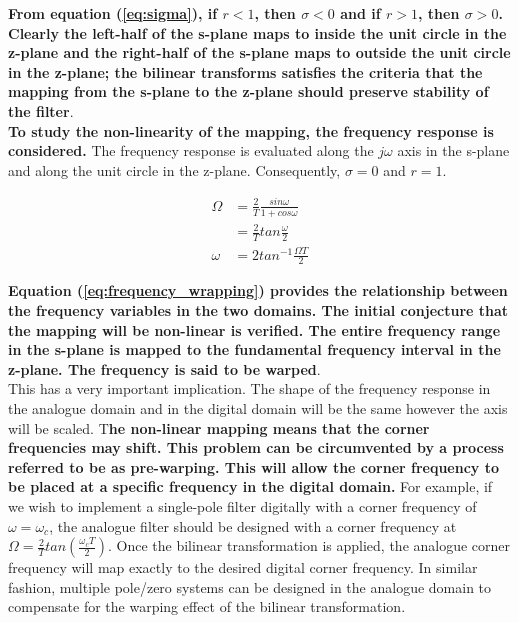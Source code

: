 \documentclass{article}
\begin{document}
\textbf{From equation (\ref{eq:sigma}), if $r < 1$, then $\sigma < 0$ and if $r > 1$, then $\sigma > 0$. Clearly the left-half of the s-plane maps to inside the unit circle in the z-plane and the right-half of the s-plane maps to outside the unit circle in the z-plane; the bilinear transforms satisfies the criteria that the mapping from the s-plane to the z-plane should preserve stability of the filter}. \\

\textbf{To study the non-linearity of the mapping, the frequency response is considered.} The frequency response is evaluated along the $j\omega$ axis in the s-plane and along the unit circle in the z-plane. Consequently, $\sigma = 0$ and $r = 1$.

\begin{align}
    \Omega &= \frac{2}{T}\frac{sin\omega}{1+cos\omega}\nonumber \\
           &= \frac{2}{T}tan\frac{\omega}{2} \nonumber \\
    \omega &= 2tan^{-1}\frac{\Omega T}{2} \label{eq:frequency_wrapping}
\end{align}

\textbf{Equation (\ref{eq:frequency_wrapping}) provides the relationship between the frequency variables in the two domains. The initial conjecture that the mapping will be non-linear is verified. The entire frequency range in the s-plane is mapped to the fundamental frequency interval in the z-plane. The frequency is said to be warped}. \\

This has a very important implication. The shape of the frequency response in the analogue domain and in the digital domain will be the same however the axis will be scaled. T\textbf{he non-linear mapping means that the corner frequencies may shift. This problem can be circumvented by a process referred to be as pre-warping. This will allow the corner frequency to be placed at a specific frequency in the digital domain.} For example, if we wish to implement a single-pole filter digitally with a corner frequency of $\omega = \omega_c$, the analogue filter should be designed with a corner frequency at $\Omega = \frac{2}{T}tan(\frac{\omega_{c} T}{2})$. Once the bilinear transformation is applied, the analogue corner frequency will map exactly to the desired digital corner frequency. In similar fashion, multiple pole/zero systems can be designed in the analogue domain to compensate for the warping effect of the bilinear transformation.
\end{document}
